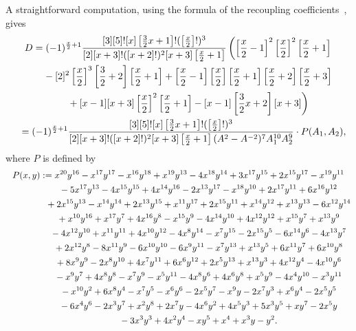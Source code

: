 \documentclass[pdftex]{sigma}
\numberwithin{equation}{section}
\begin{document}
A straightforward computation, using the formula of the recoupling coefficients~\cite{MV}, gives
\begin{gather*}
D = (-1)^{\frac{x}{2}+1}\frac{[3][5]![x] \left[\frac{3}{2}x+1 \right]!(\left[\frac{x}{2}\right]!)^3}{[2][x+3]!([x+2]!)^2[x+3] \left[\frac{x}{2}+1\right]}
\left( \left[\frac{x}{2}-1\right]^2 \left[\frac{x}{2}\right]^2\left[\frac{x}{2}+1\right] \right.\\
\hphantom{D =}{} - [2]^2\left[\frac{x}{2}\right]^3\left[\frac{3}{2}+2\right] \left[\frac{x}{2}+1\right] + \left[\frac{x}{2}-1\right]\left[\frac{x}{2}\right] \left[\frac{x}{2}+1\right] \left[\frac{x}{2}+2\right] \left[\frac{x}{2}+3\right]\\
\left.\hphantom{D =}{} + [x-1][x+3] \left[\frac{x}{2}\right]^2\left[\frac{x}{2}+1\right] - [x-1]\left[\frac{3}{2}x+2\right][x+3] \right) \\
\hphantom{D}{} = (-1)^{\frac{x}{2}+1}\frac{[3][5]![x]\left[\frac{3}{2}x+1\right]!(\left[\frac{x}{2}\right]!)^3}{[2][x+3]!([x+2]!)^2[x+3]\left[\frac{x}{2}+1\right](A^2-A^{-2})^7A_1^{10}A_2^{9}}\cdot P(A_1,A_2),
\end{gather*}
where $P$ is defined by
\begin{gather*}
P(x,y):= x^{20}y^{16}-x^{17}y^{17}-x^{16}y^{18}+x^{19}y^{13}-4x^{18}y^{14}+3x^{17}y^{15}+2x^{15}y^{17}-x^{19}y^{11}\\
\hphantom{P(x,y):=}{} -5x^{17}y^{13}-4x^{15}y^{15}+4x^{14}y^{16}-2x^{13}y^{17}-x^{18}y^{10} +2x^{17}y^{11}+6x^{16}y^{12} \\
\hphantom{P(x,y):=}{}+2x^{15}y^{13}-x^{14}y^{14}+2x^{13}y^{15}+x^{11}y^{17}+2x^{15}y^{11} +x^{14}y^{12}+x^{13}y^{13}-6x^{12}y^{14} \\
\hphantom{P(x,y):=}{}+x^{10}y^{16}+x^{17}y^7+4x^{16}y^8-x^{15}y^9-4x^{14}y^{10}+4x^{12}y^{12}+x^{15}y^7+x^{13}y^9 \\
\hphantom{P(x,y):=}{}-4x^{12}y^{10}+x^{11}y^{11}+4x^{10}y^{12}-4x^8y^{14}-x^7y^{15}-2x^{15}y^5-6x^{14}y^6-4x^{13}y^7 \\
\hphantom{P(x,y):=}{}+2x^{12}y^8 -8x^{11}y^9-6x^{10}y^{10}-6x^9y^{11}-x^7y^{13} +x^{13}y^5+6x^{11}y^7+6x^{10}y^8 \\
\hphantom{P(x,y):=}{}+8x^9y^9-2x^8y^{10}+4x^7y^{11}+6x^6y^{12}+2x^5y^{13}+x^{13}y^3+4x^{12}y^4 -4x^{10}y^6 \\
\hphantom{P(x,y):=}{}-x^9y^7+4x^8y^8 -x^7y^9-x^5y^{11}-4x^8y^6+4x^6y^8+x^5y^9-4x^4y^{10}-x^3y^{11} \\
\hphantom{P(x,y):=}{}-x^{10}y^2+6x^8y^4-x^7y^5-x^6y^6-2x^5y^7-x^9y-2x^7y^3 +x^6y^4-2x^5y^5\\
\hphantom{P(x,y):=}{}-6x^4y^6-2x^3y^7+x^2y^8+2x^7y-4x^6y^2+4x^5y^3+5x^3y^5+xy^7-2x^5y\\
\hphantom{P(x,y):=}{}-3x^3y^3+4x^2y^4-xy^5+x^4+x^3y-y^2.
\end{gather*}
\end{document}
